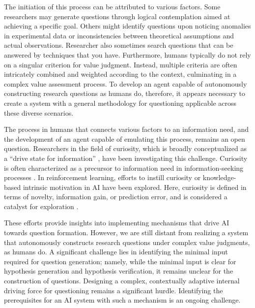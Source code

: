 The initiation of this process can be attributed to various factors. Some researchers may generate questions through logical contemplation aimed at achieving a specific goal. Others might identify questions upon noticing anomalies in experimental data or inconsistencies between theoretical assumptions and actual observations. Researcher also sometimes search questions that can be answered by techniques that you have. Furthermore, humans typically do not rely on a singular criterion for value judgment. Instead, multiple criteria are often intricately combined and weighted according to the context, culminating in a complex value assessment process. To develop an agent capable of autonomously constructing research questions as humans do, therefore, it appears necessary to create a system with a general methodology for questioning applicable across these diverse scenarios.

The process in humans that connects various factors to an information need, and the development of an agent capable of emulating this process, remains an open question. Researchers in the field of curiosity, which is broadly conceptualized as a ``drive state for information'' \cite{kidd2015psychology}, have been investigating this challenge. Curiosity is often characterized as a precursor to information need in information-seeking processes \cite{case2016looking}. In reinforcement learning, efforts to instill curiosity or knowledge-based intrinsic motivation in AI have been explored. Here, curiosity is defined in terms of novelty, information gain, or prediction error, and is considered a catalyst for exploration \cite{aubret2019survey}.

These efforts provide insights into implementing mechanisms that drive AI towards question formation. However, we are still distant from realizing a system that autonomously constructs research questions under complex value judgments, as humans do. A significant challenge lies in identifying the minimal input required for question generation; namely, while the minimal input is clear for hypothesis generation and hypothesis verification, it remains unclear for the construction of questions. Designing a complex, contextually adaptive internal driving force for questioning remains a significant hurdle. Identifying the prerequisites for an AI system with such a mechanism is an ongoing challenge.




